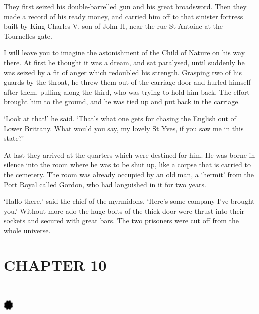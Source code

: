 \documentclass{article}
\begin{document}
\begin{center}
They first seized his double-barrelled gun and his great broadsword. Then they 
made a record of his ready money, and carried him off to that sinister fortress 
built by King Charles V, son of John II, near the rue St Antoine at the Tournelles 
gate. 

I will leave you to imagine the astonishment of the Child of Nature on his way 
there. At first he thought it was a dream, and sat paralysed, until suddenly he 
was seized by a fit of anger which redoubled his strength. Grasping two of his 
guards by the throat, he threw them out of the carriage door and hurled himself 
after them, pulling along the third, who was trying to hold him back. The effort 
brought him to the ground, and he was tied up and put back in the carriage. 

`Look at that!' he said. `That's what one gets for chasing the English out of Lower 
Brittany. What would you say, my lovely St Yves, if you saw me in this state?' 

At last they arrived at the quarters which were destined for him. He was borne 
in silence into the room where he was to be shut up, like a corpse that is carried 
to the cemetery. The room was already occupied by an old man, a `hermit' from the 
Port Royal called Gordon, who had languished in it for two years. 

`Hallo there,' said the chief of the myrmidons. `Here's some company I've brought 
you.' Without more ado the huge bolts of the thick door were thrust into their 
sockets and secured with great bars. The two prisoners were cut off from the whole 
universe.\pagebreak{} 

\section*{\textbf{CHAPTER 10  }}

\section*{%
\includegraphics[width=14pt, height=15pt, keepaspectratio=true]{Zadig or L'Ingenu - Voltaire-fig032.jpg}
}

 


\end{center}
\end{document}
